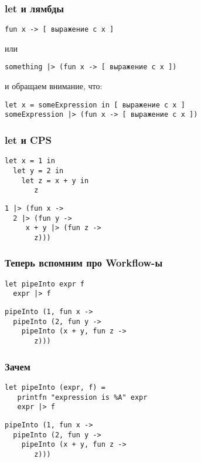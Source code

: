 \documentclass{../../slides-style}
\begin{document}
    \begin{frame}[fragile]
        \frametitle{let и лямбды}
        \begin{verbatim}
fun x -> [ выражение c x ]
        \end{verbatim}
        или
        \begin{verbatim}
something |> (fun x -> [ выражение c x ])
        \end{verbatim}
        и обращаем внимание, что:
        \begin{verbatim}
let x = someExpression in [ выражение c x ]
someExpression |> (fun x -> [ выражение c x ])
        \end{verbatim}
    \end{frame}

    \begin{frame}[fragile]
        \frametitle{let и CPS}
        \begin{verbatim}
let x = 1 in
  let y = 2 in
    let z = x + y in
       z
        \end{verbatim}
        \begin{verbatim}
1 |> (fun x ->
  2 |> (fun y -> 
     x + y |> (fun z -> 
       z)))
        \end{verbatim}
    \end{frame}

    \begin{frame}[fragile]
        \frametitle{Теперь вспомним про Workflow-ы}
        \begin{verbatim}
let pipeInto expr f
  expr |> f
        \end{verbatim}
        \begin{verbatim}
pipeInto (1, fun x ->
  pipeInto (2, fun y -> 
    pipeInto (x + y, fun z -> 
       z)))
        \end{verbatim}
    \end{frame}

    \begin{frame}[fragile]
        \frametitle{Зачем}
        \begin{verbatim}
let pipeInto (expr, f) =
   printfn "expression is %A" expr 
   expr |> f 
        \end{verbatim}
        \begin{verbatim}
pipeInto (1, fun x ->
  pipeInto (2, fun y -> 
    pipeInto (x + y, fun z -> 
       z)))
        \end{verbatim}
    \end{frame}
\end{document}
